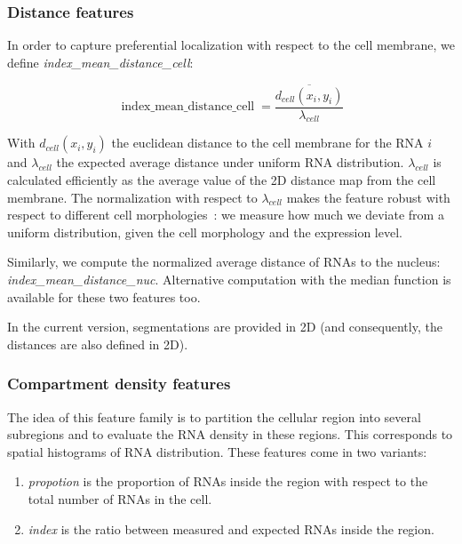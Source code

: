 \subsubsection{Distance features}

In order to capture preferential localization with respect to the cell membrane, we define \emph{index\_mean\_distance\_cell}:

\begin{equation}
	{\displaystyle \operatorname{index\_mean\_distance\_cell} = \frac{\overline{d_{cell}(x_i, y_i)}}{\lambda_{cell}}}
\end{equation}

\noindent
With $d_{cell}(x_i, y_i)$ the euclidean distance to the cell membrane for the \ac{RNA} $i$ and $\lambda_{cell}$ the expected average distance under uniform \ac{RNA} distribution.
$\lambda_{cell}$ is calculated efficiently as the average value of the 2D distance map from the cell membrane.
The normalization with respect to $\lambda_{cell}$ makes the feature robust with respect to different cell morphologies~\cite{samacoits_computational_2018}: we measure how much we deviate from a uniform distribution, given the cell morphology and the expression level.

Similarly, we compute the normalized average distance of \ac{RNA}s to the nucleus: \emph{index\_mean\_distance\_nuc}.
Alternative computation with the median function is available for these two features too.

In the current version, segmentations are provided in 2D (and consequently, the distances are also defined in 2D).

\subsubsection{Compartment density features}

The idea of this feature family is to partition the cellular region into several subregions and to evaluate the \ac{RNA} density in these regions.
This corresponds to spatial histograms of \ac{RNA} distribution.
These features come in two variants:

\begin{enumerate}
	\setlength\itemsep{0.1em}
	\item \emph{propotion} is the proportion of RNAs inside the region with respect to the total number of RNAs in the cell.
	\item \emph{index} is the ratio between measured and expected RNAs inside the region.
\end{enumerate}

